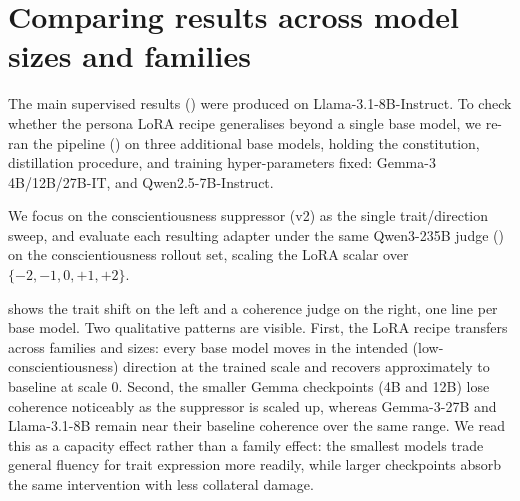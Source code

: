 \section{Comparing results across model sizes and families}\label{sec:appendix-cross-model}

The main supervised results () were produced on Llama-3.1-8B-Instruct. To check whether the persona LoRA recipe generalises beyond a single base model, we re-ran the pipeline () on three additional base models, holding the constitution, distillation procedure, and training hyper-parameters fixed: Gemma-3 4B/12B/27B-IT, and Qwen2.5-7B-Instruct.

We focus on the conscientiousness suppressor (v2) as the single trait/direction sweep, and evaluate each resulting adapter under the same Qwen3-235B judge () on the conscientiousness rollout set, scaling the LoRA scalar over $\{-2, -1, 0, +1, +2\}$.

 shows the trait shift on the left and a coherence judge on the right, one line per base model. Two qualitative patterns are visible.
First, the LoRA recipe transfers across families and sizes: every base model moves in the intended (low-conscientiousness) direction at the trained scale and recovers approximately to baseline at scale $0$.
Second, the smaller Gemma checkpoints (4B and 12B) lose coherence noticeably as the suppressor is scaled up, whereas Gemma-3-27B and Llama-3.1-8B remain near their baseline coherence over the same range. We read this as a capacity effect rather than a family effect: the smallest models trade general fluency for trait expression more readily, while larger checkpoints absorb the same intervention with less collateral damage.

